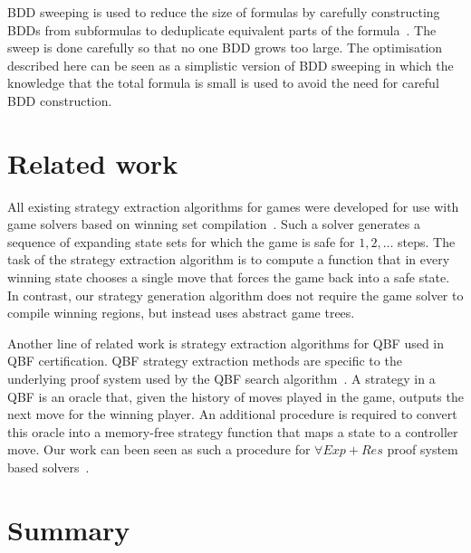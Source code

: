 BDD sweeping is used to reduce the size of formulas by carefully constructing BDDs from subformulas to deduplicate equivalent parts of the formula~\cite{Kuehlmann97}. The sweep is done carefully so that no one BDD grows too large. The optimisation described here can be seen as a simplistic version of BDD sweeping in which the knowledge that the total formula is small is used to avoid the need for careful BDD construction.

\section{Related work}

All existing strategy extraction algorithms for games were developed for use with game solvers based on winning set compilation~\cite{Bloem14}.  Such a solver generates a sequence of expanding state sets for which the game is safe for $1,2,\ldots$ steps.  The task of the strategy extraction algorithm is to compute a function that in every winning state chooses a single move that forces the game back into a safe state.  In contrast, our strategy generation algorithm does not require the game solver to compile winning regions, but instead uses abstract game trees.

Another line of related work is strategy extraction algorithms for QBF used in QBF certification. QBF strategy extraction methods are specific to the underlying proof system used by the QBF search algorithm~\cite{Lonsing10,Egly13,Goultiaeva11}.  A strategy in a QBF is an oracle that, given the history of moves played in the game, outputs the next move for the winning player.  An additional procedure is required to convert this oracle into a memory-free strategy function that maps a state to a controller move.  Our work can been seen as such a procedure for $\forall Exp+Res$ proof system based solvers~\cite{Janota13}.

\section{Summary}


